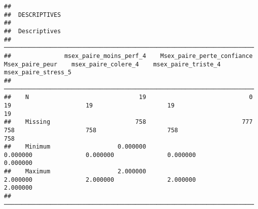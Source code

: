 \documentclass[
]{article}
\begin{document}
\begin{verbatim}
## 
##  DESCRIPTIVES
## 
##  Descriptives                                                                                                                                                 
##  ──────────────────────────────────────────────────────────────────────────────────────────────────────────────────────────────────────────────────────────── 
##               msex_paire_moins_perf_4    Msex_paire_perte_confiance    Msex_paire_peur    msex_paire_colere_4    msex_paire_triste_4    msex_paire_stress_5   
##  ──────────────────────────────────────────────────────────────────────────────────────────────────────────────────────────────────────────────────────────── 
##    N                               19                             0                 19                     19                     19                     19   
##    Missing                        758                           777                758                    758                    758                    758   
##    Minimum                   0.000000                                         0.000000               0.000000               0.000000               0.000000   
##    Maximum                   2.000000                                         2.000000               2.000000               2.000000               2.000000   
##  ────────────────────────────────────────────────────────────────────────────────────────────────────────────────────────────────────────────────────────────
\end{verbatim}
\end{document}
